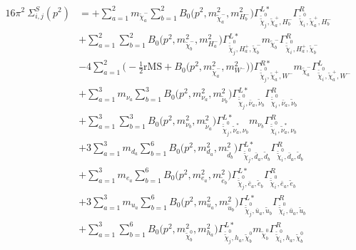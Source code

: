 \begin{itemize}
\begin{align} 
16\pi^2 \ \Sigma^S_{i,j}(p^2) &= +\sum_{a=1}^{2}m_{\tilde{\chi}^-_{{a}}} \sum_{b=1}^{2}{B_0\Big(p^{2},m^2_{\tilde{\chi}^-_{{a}}},m^2_{H^-_{{b}}}\Big)} {\Gamma^{L*}_{\check{\tilde{\chi}}^0_{{j}},\tilde{\chi}^+_{{a}},H^-_{{b}}}} {\Gamma^R_{\check{\tilde{\chi}}^0_{{i}},\tilde{\chi}^+_{{a}},H^-_{{b}}}}  \nonumber \\ 
 &+\sum_{a=1}^{2}\sum_{b=1}^{2}{B_0\Big(p^{2},m^2_{\tilde{\chi}^-_{{b}}},m^2_{H^-_{{a}}}\Big)} {\Gamma^{L*}_{\check{\tilde{\chi}}^0_{{j}},H^+_{{a}},\tilde{\chi}^-_{{b}}}} m_{\tilde{\chi}^-_{{b}}} {\Gamma^R_{\check{\tilde{\chi}}^0_{{i}},H^+_{{a}},\tilde{\chi}^-_{{b}}}} \nonumber \\ 
 &-4 \sum_{a=1}^{2}\Big(-\frac{1}{2} \text{rMS}  + {B_0\Big(p^{2},m^2_{\tilde{\chi}^-_{{a}}},m^2_{W^-}\Big)}\Big){\Gamma^{R*}_{\check{\tilde{\chi}}^0_{{j}},\tilde{\chi}^+_{{a}},W^-}} m_{\tilde{\chi}^-_{{a}}} {\Gamma^L_{\check{\tilde{\chi}}^0_{{i}},\tilde{\chi}^+_{{a}},W^-}}  \nonumber \\ 
 &+\sum_{a=1}^{3}m_{\nu_{{a}}} \sum_{b=1}^{3}{B_0\Big(p^{2},m^2_{\nu_{{a}}},m^2_{\tilde{\nu}_{{b}}}\Big)} {\Gamma^{L*}_{\check{\tilde{\chi}}^0_{{j}},\bar{\nu}_{{a}},\tilde{\nu}_{{b}}}} {\Gamma^R_{\check{\tilde{\chi}}^0_{{i}},\bar{\nu}_{{a}},\tilde{\nu}_{{b}}}}  \nonumber \\ 
 &+\sum_{a=1}^{3}\sum_{b=1}^{3}{B_0\Big(p^{2},m^2_{\nu_{{b}}},m^2_{\tilde{\nu}_{{a}}}\Big)} {\Gamma^{L*}_{\check{\tilde{\chi}}^0_{{j}},\tilde{\nu}^*_{{a}},\nu_{{b}}}} m_{\nu_{{b}}} {\Gamma^R_{\check{\tilde{\chi}}^0_{{i}},\tilde{\nu}^*_{{a}},\nu_{{b}}}} \nonumber \\ 
 &+3 \sum_{a=1}^{3}m_{d_{{a}}} \sum_{b=1}^{6}{B_0\Big(p^{2},m^2_{d_{{a}}},m^2_{\tilde{d}_{{b}}}\Big)} {\Gamma^{L*}_{\check{\tilde{\chi}}^0_{{j}},\bar{d}_{{a}},\tilde{d}_{{b}}}} {\Gamma^R_{\check{\tilde{\chi}}^0_{{i}},\bar{d}_{{a}},\tilde{d}_{{b}}}}   \nonumber \\ 
 &+\sum_{a=1}^{3}m_{e_{{a}}} \sum_{b=1}^{6}{B_0\Big(p^{2},m^2_{e_{{a}}},m^2_{\tilde{e}_{{b}}}\Big)} {\Gamma^{L*}_{\check{\tilde{\chi}}^0_{{j}},\bar{e}_{{a}},\tilde{e}_{{b}}}} {\Gamma^R_{\check{\tilde{\chi}}^0_{{i}},\bar{e}_{{a}},\tilde{e}_{{b}}}}  \nonumber \\ 
 &+3 \sum_{a=1}^{3}m_{u_{{a}}} \sum_{b=1}^{6}{B_0\Big(p^{2},m^2_{u_{{a}}},m^2_{\tilde{u}_{{b}}}\Big)} {\Gamma^{L*}_{\check{\tilde{\chi}}^0_{{j}},\bar{u}_{{a}},\tilde{u}_{{b}}}} {\Gamma^R_{\check{\tilde{\chi}}^0_{{i}},\bar{u}_{{a}},\tilde{u}_{{b}}}}   \nonumber \\ 
 &+\sum_{a=1}^{3}\sum_{b=1}^{6}{B_0\Big(p^{2},m^2_{\tilde{\chi}^0_{{b}}},m^2_{h_{{a}}}\Big)} {\Gamma^{L*}_{\check{\tilde{\chi}}^0_{{j}},h_{{a}},\tilde{\chi}^0_{{b}}}} m_{\tilde{\chi}^0_{{b}}} {\Gamma^R_{\check{\tilde{\chi}}^0_{{i}},h_{{a}},\tilde{\chi}^0_{{b}}}} \nonumber \\ 

\end{align}
\end{itemize}
